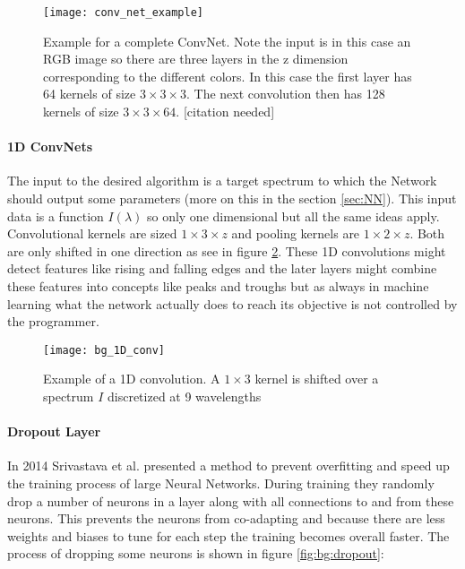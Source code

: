 \begin{figure}[H]
    \centering
    \texttt{[image: conv\_net\_example]}
    \caption{Example for a complete ConvNet. Note the input is in this case an RGB image so there are three layers in the z dimension corresponding to the different colors. In this case the first layer has 64 kernels of size $3 \times 3 \times 3$. The next convolution then has 128 kernels of size $3 \times 3 \times 64$. [citation needed]}
    \label{fig:bg:NN_example}
\end{figure}


\paragraph{1D ConvNets}
The input to the desired algorithm is a target spectrum to which the Network should output some parameters (more on this in the section \ref{sec:NN}). This input data is a function $I(\lambda)$ so only one dimensional but all the same ideas apply. Convolutional kernels are sized $1 \times 3 \times z$ and pooling kernels are $1 \times 2 \times z$. Both are  only shifted in one direction as see in figure \ref{fig:bg:1D_conv}. These 1D convolutions might detect features like rising and falling edges and the later layers might combine these features into concepts like peaks and troughs but as always in machine learning what the network actually does to reach its objective is not controlled by the programmer.

\begin{figure}[H]
    \centering
    \texttt{[image: bg\_1D\_conv]}
    \caption{Example of a 1D convolution. A $1 \times 3$ kernel is shifted over a spectrum $I$ discretized at 9 wavelengths}
    \label{fig:bg:1D_conv}
\end{figure}

\paragraph{Dropout Layer}
In 2014 Srivastava et al.\cite{Srivastava2014} presented a method to prevent overfitting and speed up the training process of large Neural Networks. During training they randomly drop a number of neurons in a layer along with all connections to and from these neurons. This prevents the neurons from co-adapting  and because there are less weights and biases to tune for each step the training becomes overall faster. The process of dropping some neurons is shown in figure \ref{fig:bg:dropout}:

